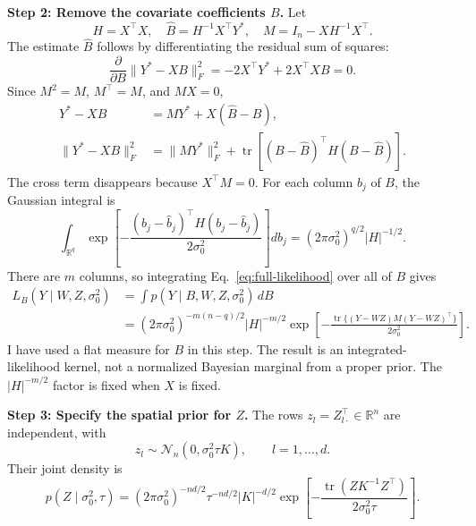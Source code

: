 \documentclass[11pt,letterpaper]{article}
\newcommand{\R}{\mathbb R}
\begin{document}
\textbf{Step 2: Remove the covariate coefficients $B$.}
Let
\begin{equation}
H=X^\top X,\quad \widehat B=H^{-1}X^\top Y^*,\quad
M=I_n-XH^{-1}X^\top.\label{eq:full-M}
\end{equation}
The estimate $\widehat B$ follows by differentiating the residual sum of squares:
\begin{equation}
\frac{\partial}{\partial B}\|Y^*-XB\|_F^2
=-2X^\top Y^*+2X^\top XB=0.
\end{equation}
Since $M^2=M$, $M^\top=M$, and $MX=0$,
\begin{align}
Y^*-XB&=MY^*+X(\widehat B-B),\\
\|Y^*-XB\|_F^2
&=\|MY^*\|_F^2+
\operatorname{tr}\!\left[(B-\widehat B)^\top H(B-\widehat B)\right].\label{eq:full-Bsquare}
\end{align}
The cross term disappears because $X^\top M=0$. For each column $b_j$ of $B$, the Gaussian integral is
\begin{equation}
\int_{\R^q}\exp\!\left[-\frac{(b_j-\widehat b_j)^\top H(b_j-\widehat b_j)}{2\sigma_0^2}\right]db_j
=(2\pi\sigma_0^2)^{q/2}|H|^{-1/2}.
\end{equation}
There are $m$ columns, so integrating Eq.~\eqref{eq:full-likelihood} over all of $B$ gives
\begin{align}
L_B(Y\mid W,Z,\sigma_0^2)
&=\int p(Y\mid B,W,Z,\sigma_0^2)\,dB\\
&=\boxed{(2\pi\sigma_0^2)^{-m(n-q)/2}|H|^{-m/2}
\exp\!\left[-\frac{\operatorname{tr}\{(Y-WZ)M(Y-WZ)^\top\}}{2\sigma_0^2}\right].}
\label{eq:full-Bintegral}
\end{align}
I have used a flat measure for $B$ in this step. The result is an integrated-likelihood kernel, not a normalized Bayesian marginal from a proper prior. The $|H|^{-m/2}$ factor is fixed when $X$ is fixed.

\textbf{Step 3: Specify the spatial prior for $Z$.}
The rows $z_l=Z_{l\cdot}^\top\in\R^n$ are independent, with
\begin{equation}
z_l\sim\mathcal N_n(0,\sigma_0^2\tau K),\qquad l=1,\ldots,d.
\end{equation}
Their joint density is
\begin{equation}
p(Z\mid\sigma_0^2,\tau)
=(2\pi\sigma_0^2)^{-nd/2}\tau^{-nd/2}|K|^{-d/2}
\exp\!\left[-\frac{\operatorname{tr}(ZK^{-1}Z^\top)}{2\sigma_0^2\tau}\right].
\label{eq:full-prior}
\end{equation}
\end{document}
